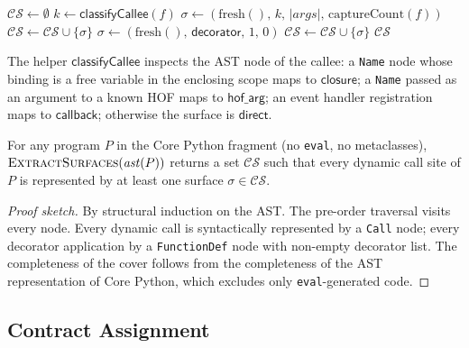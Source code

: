 \documentclass[11pt]{article}
\newcommand{\CS}{\mathcal{CS}}                 %
\newcommand{\surf}{\sigma}                     %
\begin{document}
\begin{algorithm}[H]
\caption{$\textsc{ExtractSurfaces}(\mathit{ast})$}
\begin{algorithmic}[1]
\State $\CS \gets \emptyset$
    \State $k \gets \mathsf{classifyCallee}(f)$
    \State $\surf \gets (\mathrm{fresh}(),\, k,\, |\mathit{args}|,\,
            \mathrm{captureCount}(f))$
    \State $\CS \gets \CS \cup \{\surf\}$
  \EndIf
      \State $\surf \gets (\mathrm{fresh}(),\, \mathsf{decorator},\,
              1,\, 0)$
      \State $\CS \gets \CS \cup \{\surf\}$
    \EndFor
  \EndIf
\EndFor
\Return $\CS$
\end{algorithmic}
\end{algorithm}

The helper $\mathsf{classifyCallee}$ inspects the AST node of the
callee: a \texttt{Name} node whose binding is a free variable in the
enclosing scope maps to $\mathsf{closure}$; a \texttt{Name} passed as
an argument to a known HOF maps to $\mathsf{hof\_arg}$; an event
handler registration maps to $\mathsf{callback}$; otherwise the
surface is $\mathsf{direct}$.

\begin{proposition}\label{prop:extract}
For any \Python{} program $P$ in the Core Python fragment (no
\texttt{eval}, no metaclasses), $\textsc{ExtractSurfaces}(\mathit{ast}(P))$
returns a set $\CS$ such that every dynamic call site of $P$ is
represented by at least one surface $\surf \in \CS$.
\end{proposition}

\begin{proof}[Proof sketch]
By structural induction on the AST.  The pre-order traversal visits
every node.  Every dynamic call is syntactically represented by a
\texttt{Call} node; every decorator application by a
\texttt{FunctionDef} node with non-empty decorator list.  The
completeness of the cover follows from the completeness of the AST
representation of Core Python, which excludes only
\texttt{eval}-generated code.
\end{proof}

\subsection{Contract Assignment}
\end{document}
